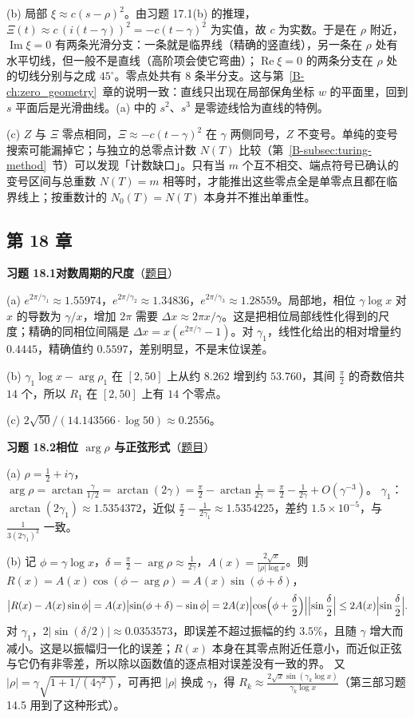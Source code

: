 \documentclass[11pt,a4paper]{article}
\renewcommand{\Re}{\operatorname{Re}}
\renewcommand{\Im}{\operatorname{Im}}
\newcommand{\bref}[1]{\ref*{B-#1}}
\newcommand{\Sol}[2]{%
  \par\addvspace{1.2em}\noindent
  \hypertarget{s:#1}{}\textbf{习题 #1\quad #2}\hfill{\small（\hyperlink{q:#1}{题目}）}\par
  \nopagebreak\smallskip}
\begin{document}
(b) 局部 $\xi\approx c(s-\rho)^2$。由习题 17.1(b) 的推理，$\Xi(t)\approx c\,(i(t-\gamma))^2=-c(t-\gamma)^2$ 为实值，故 $c$ 为实数。于是在 $\rho$ 附近，$\Im\xi=0$ 有两条光滑分支：一条就是临界线（精确的竖直线），另一条在 $\rho$ 处有水平切线，但一般不是直线（高阶项会使它弯曲）；$\Re\xi=0$ 的两条分支在 $\rho$ 处的切线分别与之成 $45^\circ$。零点处共有 $8$ 条半分支。这与第~\bref{ch:zero_geometry}~章的说明一致：直线只出现在局部保角坐标 $w$ 的平面里，回到 $s$ 平面后是光滑曲线。(a) 中的 $s^2$、$s^3$ 是零迹线恰为直线的特例。

(c) $Z$ 与 $\Xi$ 零点相同，$\Xi\approx-c(t-\gamma)^2$ 在 $\gamma$ 两侧同号，$Z$ 不变号。单纯的变号搜索可能漏掉它；与独立的总零点计数 $N(T)$ 比较（第~\bref{subsec:turing-method}~节）可以发现「计数缺口」。只有当 $m$ 个互不相交、端点符号已确认的变号区间与总重数 $N(T)=m$ 相等时，才能推出这些零点全是单零点且都在临界线上；按重数计的 $N_0(T)=N(T)$ 本身并不推出单重性。

\subsection*{第 18 章}

\Sol{18.1}{对数周期的尺度}
(a) $e^{2\pi/\gamma_1}\approx1.55974$，$e^{2\pi/\gamma_2}\approx1.34836$，$e^{2\pi/\gamma_3}\approx1.28559$。局部地，相位 $\gamma\log x$ 对 $x$ 的导数为 $\gamma/x$，增加 $2\pi$ 需要 $\Delta x\approx2\pi x/\gamma$。这是把相位局部线性化得到的尺度；精确的同相位间隔是 $\Delta x=x(e^{2\pi/\gamma}-1)$。对 $\gamma_1$，线性化给出的相对增量约 $0.4445$，精确值约 $0.5597$，差别明显，不是末位误差。

(b) $\gamma_1\log x-\arg\rho_1$ 在 $[2,50]$ 上从约 $8.262$ 增到约 $53.760$，其间 $\frac\pi2$ 的奇数倍共 $14$ 个，所以 $R_1$ 在 $[2,50]$ 上有 $14$ 个零点。

(c) $2\sqrt{50}/(14.143566\cdot\log50)\approx0.2556$。

\Sol{18.2}{相位 $\arg\rho$ 与正弦形式}
(a) $\rho=\frac12+i\gamma$，$\arg\rho=\arctan\frac{\gamma}{1/2}=\arctan(2\gamma)=\frac\pi2-\arctan\frac1{2\gamma}=\frac\pi2-\frac1{2\gamma}+O(\gamma^{-3})$。
$\gamma_1$：$\arctan(2\gamma_1)\approx1.5354372$，近似 $\frac\pi2-\frac1{2\gamma_1}\approx1.5354225$，差约 $1.5\times10^{-5}$，与 $\frac1{3(2\gamma_1)^3}$ 一致。

(b) 记 $\phi=\gamma\log x$，$\delta=\frac\pi2-\arg\rho\approx\frac1{2\gamma}$，$A(x)=\frac{2\sqrt x}{|\rho|\log x}$。则 $R(x)=A(x)\cos(\phi-\arg\rho)=A(x)\sin(\phi+\delta)$，
\[
  \bigl|R(x)-A(x)\sin\phi\bigr|=A(x)\bigl|\sin(\phi+\delta)-\sin\phi\bigr|=2A(x)\Bigl|\cos\Bigl(\phi+\frac\delta2\Bigr)\Bigr|\Bigl|\sin\frac\delta2\Bigr|\le2A(x)\Bigl|\sin\frac\delta2\Bigr| .
\]
对 $\gamma_1$，$2|\sin(\delta/2)|\approx0.0353573$，即误差不超过振幅的约 $3.5\%$，且随 $\gamma$ 增大而减小。这是以振幅归一化的误差；$R(x)$ 本身在其零点附近任意小，而近似正弦与它仍有非零差，所以除以函数值的逐点相对误差没有一致的界。
又 $|\rho|=\gamma\sqrt{1+1/(4\gamma^2)}$，可再把 $|\rho|$ 换成 $\gamma$，得 $R_k\approx\frac{2\sqrt x\sin(\gamma_k\log x)}{\gamma_k\log x}$（第三部习题 14.5 用到了这种形式）。
\end{document}
